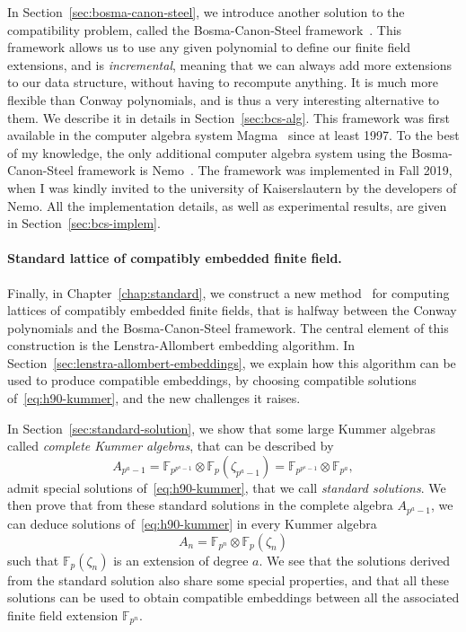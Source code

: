 In Section~\ref{sec:bosma-canon-steel}, we introduce another solution to the
compatibility problem, called the Bosma-Canon-Steel framework~\cite{BCS97}.
This framework allows us to use any given polynomial to define our finite field
extensions, and is \emph{incremental}, meaning that we can always add more
extensions to our data structure, without having to recompute anything. It is
much more flexible than Conway polynomials, and is thus a very interesting
alternative to them. We describe it in details in Section~\ref{sec:bcs-alg}.
This framework was first available in the computer algebra system
Magma~\cite{Magma} since at least 1997. To the best of my knowledge, the only
additional computer algebra system using the Bosma-Canon-Steel framework is
Nemo~\cite{Nemo}. The framework was implemented in Fall 2019, when I was kindly
invited to the university of Kaiserslautern by the developers of Nemo. All the
implementation details, as well as experimental results, are given in
Section~\ref{sec:bcs-implem}.

\paragraph{Standard lattice of compatibly embedded finite field.}
Finally, in Chapter~\ref{chap:standard}, we construct a new method~\cite{DRR19}
for computing lattices of compatibly embedded finite fields, that is halfway
between the Conway polynomials and the Bosma-Canon-Steel framework. The central
element of this construction is the Lenstra-Allombert embedding algorithm. In
Section~\ref{sec:lenstra-allombert-embeddings}, we explain how this algorithm
can be used to produce compatible embeddings, by choosing compatible solutions
of~\eqref{eq:h90-kummer}, and the new challenges it raises.

In Section~\ref{sec:standard-solution}, we show that some large Kummer algebras
called \emph{complete Kummer algebras}, that can be described by
\[
  A_{p^a-1} = \mathbb{F}_{p^{p^a-1}}\otimes\mathbb{F}_{p}(\zeta_{p^a-1})
  = \mathbb{F}_{p^{p^a-1}}\otimes \mathbb{F}_{p^a},
\]
admit special solutions of~\eqref{eq:h90-kummer}, that we call \emph{standard
solutions}. We then prove that from these standard solutions in the complete
algebra $A_{p^a-1}$, we can deduce solutions of~\eqref{eq:h90-kummer} in every
Kummer algebra
\[
  A_n = \mathbb{F}_{p^n}\otimes \mathbb{F}_{p}(\zeta_n)
\]
such that $\mathbb{F}_{p}(\zeta_n)$ is an extension of degree $a$. We see that
the solutions derived from the standard solution also share some special
properties, and that all these solutions can be used to obtain
compatible embeddings between all the associated finite field extension
$\mathbb{F}_{p^n}$.


